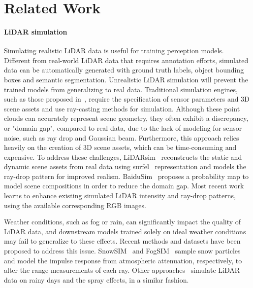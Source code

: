 \section{Related Work}
\label{sec:relwork}
\paragraph{LiDAR simulation}
Simulating realistic LiDAR data is useful for training perception models. Different from real-world LiDAR data that requires annotation efforts, simulated data can be automatically generated with ground truth labels, \eg object bounding boxes and semantic segmentation. Unrealistic LiDAR simulation will prevent the trained models from generalizing to real data.   %
Traditional simulation engines, such as those proposed in~\cite{dosovitskiy2017carla,koenig2004design}, require the specification of sensor parameters and 3D scene assets and use ray-casting methods for simulation. 
 Although these point clouds can accurately represent scene geometry, they often exhibit a discrepancy, or "domain gap", compared to real data, due to the lack of modeling for sensor noise, such as ray drop and Gaussian beam. 
Furthermore, this approach relies heavily on the creation of 3D scene assets, which can be time-consuming and expensive. 
To address these challenges, LiDARsim~\cite{manivasagam2020lidarsim} reconstructs the static and dynamic scene assets from real data using surfel~\cite{pfister2000surfels} representation and models the ray-drop pattern for improved realism. BaiduSim~\cite{baidusim} proposes a probability map to model scene compositions in order to reduce the domain gap. Most recent work~\cite{guillard2022learning} learns to enhance existing simulated LiDAR intensity and ray-drop patterns, using the available corresponding RGB images. 

Weather conditions, such as fog or rain, can significantly impact the quality of LiDAR data, and downstream models trained solely on ideal weather conditions may fail to generalize to these effects. Recent methods and datasets \cite{hahner2021fog,hahner2022lidar,kilic2021lidar,bijelic2020seeing} have been proposed to address this issue. %
  SnowSIM~\cite{hahner2022lidar} and FogSIM~\cite{hahner2021fog} sample snow particles and model the impulse response from atmospheric attenuation, respectively, to alter the range measurements of each ray.
 Other approaches~\cite{shih2022reconstruction,kilic2021lidar, kurup2021dsor} simulate LiDAR data on rainy days and the spray effects, in a similar fashion.


